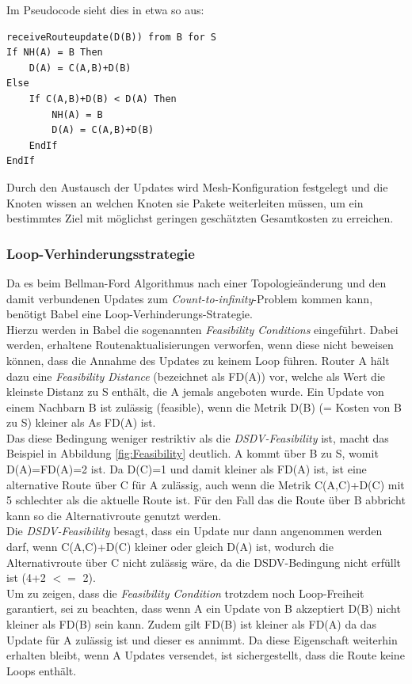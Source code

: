 \documentclass[10pt]{scrartcl}
\begin{document}
Im Pseudocode sieht dies in etwa so aus:
\begin{lstlisting}
receiveRouteupdate(D(B)) from B for S
If NH(A) = B Then
	D(A) = C(A,B)+D(B)
Else
	If C(A,B)+D(B) < D(A) Then
		NH(A) = B
		D(A) = C(A,B)+D(B)
	EndIf
EndIf
\end{lstlisting}

Durch den Austausch der Updates wird Mesh-Konfiguration festgelegt und die Knoten wissen an welchen Knoten sie Pakete weiterleiten müssen, um ein bestimmtes Ziel mit möglichst geringen geschätzten Gesamtkosten zu erreichen.

\subsubsection{Loop-Verhinderungsstrategie}
Da es beim Bellman-Ford Algorithmus nach einer Topologieänderung und den damit verbundenen Updates zum \textit{Count-to-infinity}-Problem kommen kann, benötigt Babel eine Loop-Verhinderungs-Strategie.\\
Hierzu werden in Babel die sogenannten \textit{Feasibility Conditions} eingeführt. Dabei werden, erhaltene Routenaktualisierungen verworfen, wenn diese nicht beweisen können, dass die Annahme des Updates zu keinem Loop führen. Router A hält dazu eine \textit{Feasibility Distance} (bezeichnet als FD(A)) vor, welche als Wert die kleinste Distanz zu S enthält, die A jemals angeboten wurde. Ein Update von einem Nachbarn B ist zulässig (feasible), wenn die Metrik D(B) (= Kosten von B zu S) kleiner als As FD(A) ist.\\
Das diese Bedingung weniger restriktiv als die \textit{DSDV-Feasibility} ist, macht das Beispiel in Abbildung \ref{fig:Feasibility} deutlich. A kommt über B zu S, womit D(A)=FD(A)=2 ist. Da D(C)=1 und damit kleiner als FD(A) ist, ist eine alternative Route über C für A zulässig, auch wenn die Metrik C(A,C)+D(C) mit 5 schlechter als die aktuelle Route ist. Für den Fall das die Route über B abbricht kann so die Alternativroute genutzt werden.\\
Die \textit{DSDV-Feasibility} besagt, dass ein Update nur dann angenommen werden darf, wenn C(A,C)+D(C) kleiner oder gleich D(A) ist, wodurch die Alternativroute über C nicht zulässig wäre, da die DSDV-Bedingung nicht erfüllt ist (4+2 $<=$ 2).\\
Um zu zeigen, dass die \textit{Feasibility Condition} trotzdem noch Loop-Freiheit garantiert, sei zu beachten, dass wenn A ein Update von B akzeptiert D(B) nicht kleiner als FD(B) sein kann. Zudem gilt FD(B) ist kleiner als FD(A) da das Update für A zulässig ist und dieser es annimmt. Da diese Eigenschaft weiterhin erhalten bleibt, wenn A Updates versendet, ist sichergestellt, dass die Route keine Loops enthält.
\end{document}
